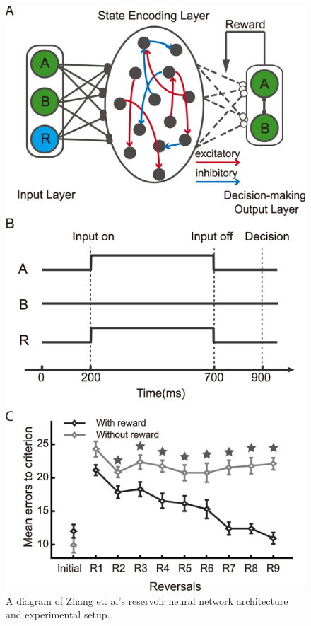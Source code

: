 \documentclass[11pt]{article}
\makeatletter
\def\maxwidth{\ifdim\Gin@nat@width>\linewidth\linewidth
    \else\Gin@nat@width\fi}
\let\Oldincludegraphics\includegraphics
\renewcommand{\includegraphics}[1]{\Oldincludegraphics[width=.8\maxwidth]{#1}}
\makeatother
\begin{document}
\begin{figure}
\centering
\includegraphics{journal_pcbi_1005925_g001.PNG}
\caption{A diagram of Zhang et. al's reservoir neural network architecture and experimental setup.}
\end{figure}
\end{document}
